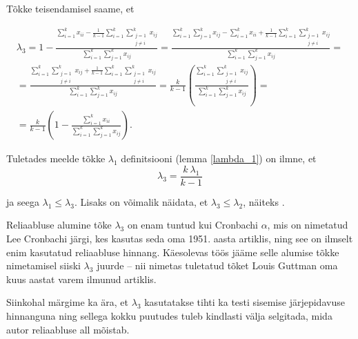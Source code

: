 \documentclass[a4paper,12pt,oneside]{article}
\newcounter{lemma}[section]
\numberwithin{equation}{section}
\theoremstyle{definition}
\begin{document}
Tõkke teisendamisel saame, et

\begin{equation*}
\begin{gathered}
\lambda_3 = 1 - \frac{\sum \limits_{i=1}^k x_{ii} -  \frac{1}{k - 1} \sum \limits_{i=1}^k   \sum \limits_{\substack{j=1 \\ j \neq i}}^{k} x_{ij} }{\sum \limits_{i=1}^k \sum \limits_{j=1}^k x_{ij}} 
= \frac{\sum \limits_{i=1}^k \sum \limits_{j=1}^k x_{ij} - \sum \limits_{i=1}^k x_{ii} +  \frac{1}{k - 1} \sum \limits_{i=1}^k   \sum \limits_{\substack{j=1 \\ j \neq i}}^{k} x_{ij} }{\sum \limits_{i=1}^k \sum \limits_{j=1}^k x_{ij}} = \\
= \frac{\sum \limits_{i=1}^k   \sum \limits_{\substack{j=1 \\ j \neq i}}^{k} x_{ij}  +  \frac{1}{k - 1} \sum \limits_{i=1}^k   \sum \limits_{\substack{j=1 \\ j \neq i}}^{k} x_{ij} }{\sum \limits_{i=1}^k \sum \limits_{j=1}^k x_{ij}} 
= \frac{k}{k-1} \left( \frac{\sum \limits_{i=1}^k \sum \limits_{\substack{j=1 \\ j \neq i}}^{k} x_{ij} }{\sum \limits_{i=1}^k \sum \limits_{j=1}^k x_{ij}} \right) = \\
= \frac{k}{k-1} \left(1 - \frac{\sum \limits_{i=1}^k x_{ii}}{\sum \limits_{i=1}^k \sum \limits_{j=1}^k x_{ij}} \right).
\end{gathered}
\end{equation*}

Tuletades meelde tõkke $\lambda_1$ definitsiooni (lemma \ref{lambda_1}) on ilmne, et
\begin{equation}
\label{eq:lambda_3_from_lambda_1}
\lambda_3 = \frac{k\ \lambda_1}{k-1}
\end{equation}

ja seega $\lambda_1 \leq \lambda_3$. Lisaks on võimalik näidata, et $\lambda_3 \leq \lambda_2$, näiteks \cite[148-149]{Revelle2008}.


Reliaabluse alumine tõke $\lambda_3$ on enam tuntud kui Cronbachi $\alpha$, mis on nimetatud Lee Cronbachi järgi, kes kasutas seda oma 1951. aasta artiklis\cite{Cronbach1951}, ning see on ilmselt enim kasutatud reliaabluse hinnang. Käesolevas töös jääme  selle alumise tõkke nimetamisel siiski $\lambda_3$ juurde -- nii nimetas tuletatud tõket Louis Guttman oma kuus aastat varem ilmunud artiklis\cite{Guttman1945}.

Siinkohal märgime ka ära, et $\lambda_3$ kasutatakse tihti ka  testi sisemise järjepidavuse hinnanguna ning sellega kokku puutudes tuleb kindlasti välja selgitada, mida autor reliaabluse all mõistab.
\end{document}
